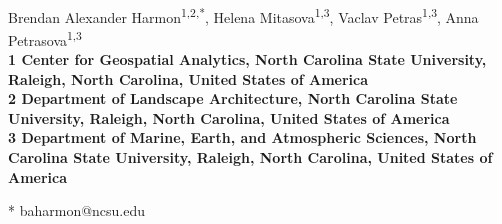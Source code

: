 \documentclass[10pt,letterpaper]{article}
\date{}
\begin{document}
\vspace*{0.35in}



\begin{flushleft}
{\Large
\textbf{}
}
\newline
\\
Brendan Alexander Harmon\textsuperscript{1,2,*},
Helena Mitasova\textsuperscript{1,3},
Vaclav Petras\textsuperscript{1,3},
Anna Petrasova\textsuperscript{1,3}
\\
\bigskip
\bf{1} Center for Geospatial Analytics, North Carolina State University, Raleigh, North Carolina, United States of America
\\
\bf{2} Department of Landscape Architecture, North Carolina State University, Raleigh, North Carolina, United States of America
\\
\bf{3} Department of Marine, Earth, and Atmospheric Sciences, North Carolina State University, Raleigh, North Carolina, United States of America
\\
\bigskip

% 
%





* baharmon@ncsu.edu

\end{flushleft}
\end{document}
